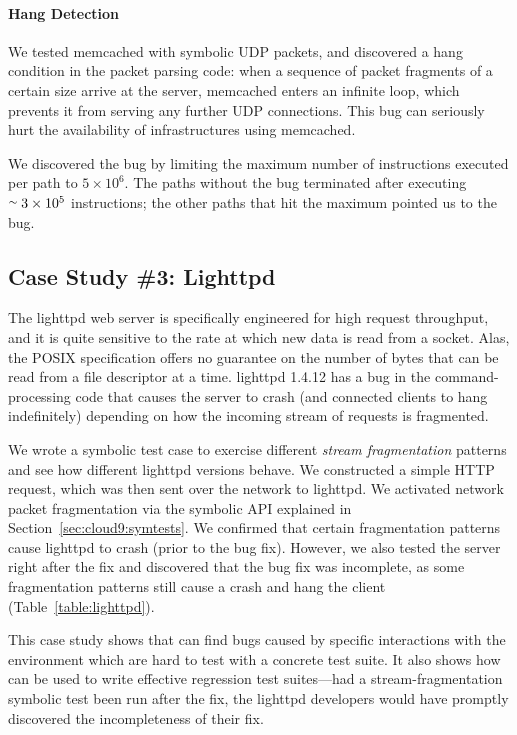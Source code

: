 \paragraph{Hang Detection}

We tested memcached with symbolic UDP packets, and \cnine discovered a hang condition in the packet parsing code: 
when a sequence of packet fragments of a certain size arrive at the server, memcached enters an infinite loop, which prevents it from serving any further UDP connections. This bug can seriously hurt the availability of infrastructures using memcached.

We discovered the bug by limiting the maximum number of instructions executed per path to $5 \times 10^6$.  The paths without the bug terminated after executing $\stackrel{\sim}{} 3\times 10^5$ instructions; the other paths that hit the maximum pointed us to the bug.

\subsection{Case Study \#3: Lighttpd}
\label{sec:eval:lighttpd}


The lighttpd web server is specifically engineered for high request throughput, and it is quite sensitive to the rate at which new data is read from a socket.  Alas, the POSIX specification offers no guarantee on the number of bytes that can be read from a file descriptor at a time.  lighttpd 1.4.12 has a bug in the command-processing code that causes the server to crash (and connected clients to hang indefinitely) depending on how the incoming stream of requests is fragmented. 

We wrote a symbolic test case to exercise different \emph{stream fragmentation} patterns and see how different lighttpd versions behave. We constructed a simple HTTP request, which was then sent over the network to lighttpd. We activated network packet fragmentation via the symbolic   API explained in Section~\ref{sec:cloud9:symtests}. We confirmed that certain fragmentation patterns cause lighttpd to crash (prior to the bug fix). However, we also tested the server right after the fix and discovered that the bug fix was incomplete, as some fragmentation patterns still cause a crash and hang the client (Table~\ref{table:lighttpd}).

This case study shows that \cnine can find bugs caused by specific interactions with the environment which are hard to test with a concrete test suite. It also shows how \cnine can be used to write effective regression test suites---had a stream-fragmentation symbolic test been run after the fix, the lighttpd developers would have promptly discovered the incompleteness of their fix.

